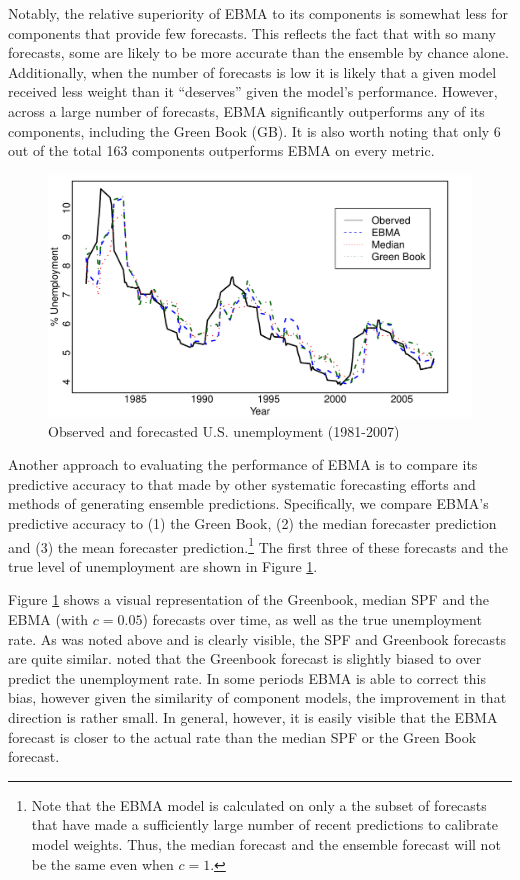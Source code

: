 \documentclass[12pt,fullpage,endnotes]{article}
\begin{document}
Notably, the relative superiority of EBMA to its components is
somewhat less for components that provide few forecasts.  This
reflects the fact that with so many forecasts, some are likely to be
more accurate than the ensemble by chance alone. Additionally, when
the number of forecasts is low it is likely that a given model
received less weight than it ``deserves'' given the model's
performance.  However, across a large number of forecasts, EBMA
significantly outperforms any of its components, including the Green
Book (GB).  It is also worth noting that only 6 out of the total 163
components outperforms EBMA on every metric.

\begin{figure}[h]
\caption{Observed and forecasted U.S. unemployment (1981-2007)}
\label{timeSeries}
\begin{center}
\includegraphics[scale=.8]{timeSeries}
\end{center}
\end{figure}


Another approach to evaluating the performance of EBMA is to compare
its predictive accuracy to that made by other systematic forecasting
efforts and methods of generating ensemble predictions.  Specifically,
we compare EBMA's predictive accuracy to (1) the Green Book, (2) the
median forecaster prediction and (3) the mean forecaster
prediction.\footnote{Note that the EBMA model is calculated on only a the
  subset of forecasts that have made a sufficiently large number of
  recent predictions to calibrate model weights.  Thus, the median
  forecast and the ensemble forecast will not be the same even when
  $c=1$.  }  The first three of these forecasts and the true level of
unemployment are shown in Figure \ref{timeSeries}.

Figure \ref{timeSeries} shows a visual representation of the
Greenbook, median SPF and the EBMA (with $c=0.05$) forecasts over
time, as well as the true unemployment rate. As was noted above and is
clearly visible, the SPF and Greenbook forecasts are quite
similar. \citet{Baghestani:2008} noted that the Greenbook forecast is
slightly biased to over predict the unemployment rate. In some periods
EBMA is able to correct this bias, however given the similarity of
component models, the improvement in that direction is rather
small. In general, however, it is easily visible that the EBMA forecast
is closer to the actual rate than the median SPF or the Green Book
forecast.
\end{document}

